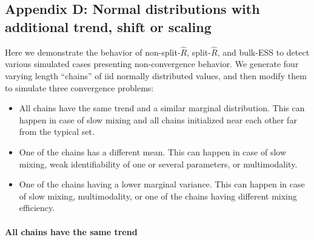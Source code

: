 \documentclass[american,]{article}
\providecommand{\tightlist}{%
  \setlength{\itemsep}{0pt}\setlength{\parskip}{0pt}}
\let\oldparagraph\paragraph
\renewcommand{\paragraph}[1]{\oldparagraph{#1}\mbox{}}
\begin{document}



\hypertarget{AppendixD}{%
\subsection*{Appendix D: Normal distributions with additional trend,
shift or scaling}\label{AppendixD}}

Here we demonstrate the behavior of non-split-\(\widehat{R}\),
split-\(\widehat{R}\), and bulk-ESS to detect various simulated cases
presenting non-convergence behavior. We generate four varying length
``chains'' of iid normally distributed values, and then modify them to
simulate three convergence problems:
\begin{itemize}
\tightlist
\item All chains have the same trend and a similar marginal
  distribution. This can happen in case of slow mixing and all chains
  initialized near each other far from the typical set.
\item One of the chains has a different mean. This can happen in case
  of slow mixing, weak identifiability of one or several parameters, or
  multimodality.
\item One of the chains having a lower marginal variance. This can
  happen in case of slow mixing, multimodality, or one of the chains
  having different mixing efficiency.
\end{itemize}


\hypertarget{adding-the-same-trend-to-all-chains}{%
\paragraph{All chains have the same trend}\label{adding-the-same-trend-to-all-chains}}
\end{document}
